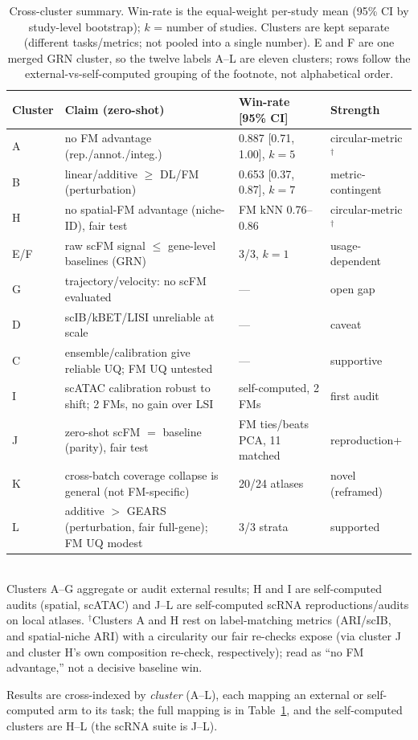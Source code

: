 \documentclass[journal]{IEEEtran}
\begin{document}
\begin{table}[!tbp]\centering\footnotesize
\caption{Cross-cluster summary. Win-rate is the equal-weight per-study mean (95\% CI by study-level bootstrap); $k$ = number of studies. Clusters are kept separate (different tasks/metrics; not pooled into a single number). E and F are one merged GRN cluster, so the twelve labels A--L are eleven clusters; rows follow the external-vs-self-computed grouping of the footnote, not alphabetical order.}
\label{tab:clusters}
\begin{tabular}{@{}l p{6.1cm} p{3.1cm} l@{}}
\toprule
Cluster & Claim (zero-shot) & Win-rate [95\% CI] & Strength \\
\midrule
A & no FM advantage (rep./annot./integ.) & 0.887 [0.71, 1.00], $k{=}5$ & circular-metric$^\dagger$ \\
B & linear/additive $\geq$ DL/FM (perturbation) & 0.653 [0.37, 0.87], $k{=}7$ & metric-contingent \\
H & no spatial-FM advantage (niche-ID), fair test & FM kNN 0.76--0.86 & circular-metric$^\dagger$ \\
E/F & raw scFM signal $\leq$ gene-level baselines (GRN) & 3/3, $k{=}1$ & usage-dependent \\
G & trajectory/velocity: no scFM evaluated & --- & open gap \\
D & scIB/kBET/LISI unreliable at scale & --- & caveat \\
C & ensemble/calibration give reliable UQ; FM UQ untested & --- & supportive \\
I & scATAC calibration robust to shift; 2 FMs, no gain over LSI & self-computed, 2 FMs & first audit \\
\midrule
J & zero-shot scFM $=$ baseline (parity), fair test & FM ties/beats PCA, 11 matched & reproduction+ \\
K & cross-batch coverage collapse is general (not FM-specific) & 20/24 atlases & novel (reframed) \\
L & additive $>$ GEARS (perturbation, fair full-gene); FM UQ modest & 3/3 strata & supported \\
\bottomrule
\end{tabular}
\\[2pt]
\footnotesize Clusters A--G aggregate or audit external results; H and I are self-computed audits (spatial, scATAC) and J--L are self-computed scRNA reproductions/audits on local atlases. $^\dagger$Clusters A and H rest on label-matching metrics (ARI/scIB, and spatial-niche ARI) with a circularity our fair re-checks expose (via cluster J and cluster H's own composition re-check, respectively); read as ``no FM advantage,'' not a decisive baseline win.
\end{table}
\noindent Results are cross-indexed by \emph{cluster} (A--L), each mapping an external or self-computed arm to its task; the full mapping is in Table~\ref{tab:clusters}, and the self-computed clusters are H--L (the scRNA suite is J--L).
\end{document}
